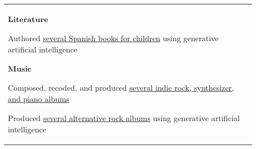 \documentclass[letterpaper,10pt,oneside]{article}
\newcommand{\itemspacingtwo}{\vspace{0.08cm}}
\newenvironment{body}
{\par\par
\begin{longtable}{p{0.145\textwidth}p{0.81\textwidth}}}
{\par\end{longtable}\par}
\begin{document}
\begin{body}
\textbf{Literature}
\begin{comp}
\item Authored \href{https://www.amazon.es/dp/B0C4DVR9N5}{several Spanish books for children} using generative artificial intelligence
\end{comp}
\itemspacingtwo

\textbf{Music}
\begin{comp}
\item Composed, recoded, and produced \href{https://open.spotify.com/artist/3RPEdOJGGdk3kOnmVq3dgX/discography/all}{several indie rock, synthesizer, and piano albums}
\item Produced \href{https://open.spotify.com/artist/6GdiI8ZKeWhSY73WWOhbep}{several alternative rock albums} using generative artificial intelligence

\end{comp}

\end{body}
\end{document}

